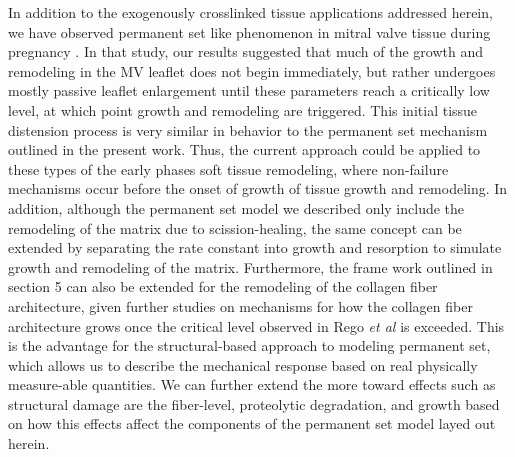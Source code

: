 	In addition to the exogenously crosslinked tissue applications addressed herein, we have observed permanent set like phenomenon in mitral valve tissue during pregnancy \cite{rego_mitral_2016}. In that study, our results suggested that much of the growth and remodeling in the MV leaflet does not begin immediately, but rather undergoes mostly passive leaflet enlargement until these parameters reach a critically low level, at which point growth and remodeling are triggered. This initial tissue distension process is very similar in behavior to the permanent set mechanism outlined in the present work. Thus, the current approach could be applied to these types of the early phases soft tissue remodeling, where non-failure mechanisms occur before the onset of growth of tissue growth and remodeling. In addition, although the permanent set model we described only include the remodeling of the matrix due to scission-healing, the same concept can be extended by separating the rate constant into growth and resorption to simulate growth and remodeling of the matrix. Furthermore, the frame work outlined in section 5 can also be extended for the remodeling of the collagen fiber architecture, given further studies on mechanisms for how the collagen fiber architecture grows once the critical level observed in Rego \textit{et al} \cite{rego_mitral_2016} is exceeded. This is the advantage for the structural-based approach to modeling permanent set, which allows us to describe the mechanical response based on real physically measure-able quantities. We can further extend the more toward effects such as structural damage are the fiber-level, proteolytic degradation, and growth based on how this effects affect the components of the permanent set model layed out herein.